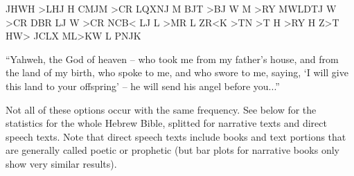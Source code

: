 \documentclass{report}
\newcommand{\cl}[2]{\begingroup\beginL\begingroup\color{#1}\beginR#2\endR\endgroup\endL\endgroup}
\begin{document}
\begin{itemize}
\begin{cjhebrew}
\cl{red}{JHWH >LHJ H CMJM >CR LQXNJ M BJT >BJ W M >RY MWLDTJ W >CR DBR LJ W >CR NCB< LJ L >MR L ZR<K >TN >T H >RY H Z>T} \\
HW> JCLX ML>KW L PNJK
\end{cjhebrew}

``Yahweh, the God of heaven -- who took me from my father’s house, and from the land of my birth, who spoke to me, and who swore to me, saying, `I will give this land to your offspring' -- he will send his angel before you...''
\end{itemize}

Not all of these options occur with the same frequency. See below for the statistics for the whole Hebrew Bible, splitted for narrative texts and direct speech texts. Note that direct speech texts include books and text portions that are generally called poetic or prophetic (but bar plots for narrative books only show very similar results).\\

\noindent
\begin{minipage}{.5\textwidth}

\end{minipage}
\begin{minipage}{.5\textwidth}
\centering

\end{minipage}

%
%

%
%
\end{document}
